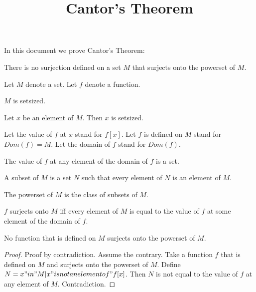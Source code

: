 \documentclass{article}
\title{Cantor's Theorem}
\author{}
\date{}
\begin{document}

  \maketitle

  In this document we prove Cantor's Theorem:

  \begin{theorem}
    There is no surjection defined on a set $M$ that surjects onto the powerset of $M$.
  \end{theorem}

  \begin{forthel}

    Let $M$ denote a set. Let $f$ denote a function.

    \begin{axiom}
        $M$ is setsized.
    \end{axiom}

    \begin{axiom}
        Let $x$ be an element of $M$. Then $x$ is setsized.
    \end{axiom}

    Let the value of $f$ at $x$ stand for $f[x]$. Let $f$ is defined on $M$ stand for $Dom(f) = M$. Let the domain of $f$ stand for $Dom(f)$.


    \begin{axiom}
      The value of $f$ at any element of the domain of $f$ is a set.
    \end{axiom}

    \begin{definition}[subset]
      A subset of $M$ is a set $N$ such that every element of $N$ is an element of $M$.
    \end{definition}

    \begin{definition}
      The powerset of $M$ is the class of subsets of $M$.
    \end{definition}

    \begin{definition}
      $f$ surjects onto $M$ iff every element of $M$ is equal to the value of $f$ at some element of the domain of $f$.
    \end{definition}

    \begin{proposition}
      No function that is defined on $M$ surjects onto the powerset of $M$.
    \end{proposition}
    \begin{proof}
      Proof by contradiction. Assume the contrary. Take a function $f$ that is defined on $M$ and surjects onto the powerset of $M$. Define $N = {x "in" M | x "is not an element of" f[x]}$. Then $N$ is not equal to the value of $f$ at any element of $M$. Contradiction.
    \end{proof}

  \end{forthel}
\end{document}
